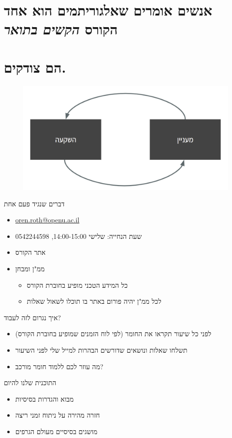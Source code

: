 \documentclass[luatex]{beamer}
\begin{document}
 \section{אנשים אומרים שאלגוריתמים הוא אחד הקורס 
 \textit{הקשים בתואר}
}
  \section{הם צודקים.}
  \begin{frame}
  \begin{figure}
  	\centering
  	\includegraphics[width=1\linewidth]{imgs/hard}
  	\label{fig:hard}
  \end{figure}
  \end{frame}
\begin{frame}{דברים שנגיד פעם אחת}
\begin{itemize}[<+->]
	\item \url{oren.roth@openu.ac.il}
	\item שעת הנחייה: שלישי 14:00-15:00, 0542244598
	\item אתר הקורס
	\item   ממ"ן ומבחן
	\begin{itemize}[<+->]
		\item כל המידע הטכני מופיע בחוברת הקורס
		\item לכל ממ"ן יהיה פורום באתר בו תוכלו לשאול שאלות
	\end{itemize}
\end{itemize}
\end{frame}
\begin{frame}{איך נגרום לזה לעבוד?}
\begin{itemize}[<+->]
\item לפני כל שיעור תקראו את החומר (לפי לוח הזמנים שמופיע בחוברת הקורס)
\item תשלחו שאלות ונושאים שדורשים הבהרות למייל שלי לפני השיעור
\item מה עוזר לכם ללמוד חומר מורכב?
\end{itemize}
\end{frame}
\begin{frame}{התוכנית שלנו להיום}
\begin{itemize}
	\item מבוא והגדרות בסיסיות 
	\item חזרה מהירה על ניתוח זמני ריצה
	\item מושגים בסיסיים מעולם הגרפים
\end{itemize}
\end{frame}
\end{document}
